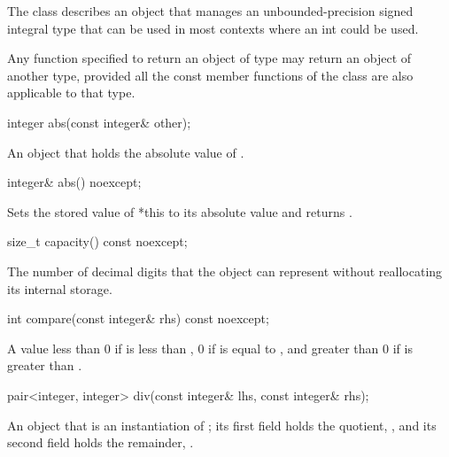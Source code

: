 The class describes an object that manages an unbounded-precision signed integral type that can be used in most contexts where an int could be used.

Any function specified to return an object of type  may return an object of another type, provided all the const member functions of the class  are also applicable to that type.

\begin{itemdecl}
integer abs(const integer& other);	
\end{itemdecl}

\begin{itemdescr}
\returns An object that holds the absolute value of .		
\end{itemdescr}

\begin{itemdecl}
integer& abs() noexcept;	
\end{itemdecl}

\begin{itemdescr}
\effects Sets the stored value of *this to its absolute value and returns .		
\end{itemdescr}

\begin{itemdecl}
size_t capacity() const noexcept;	
\end{itemdecl}

\begin{itemdescr}
\returns The number of decimal digits that the object can represent without reallocating its internal storage.		
\end{itemdescr}

\begin{itemdecl}
int compare(const integer& rhs) const noexcept;	
\end{itemdecl}

\begin{itemdescr}
\returns A value less than 0 if  is less than , 0 if  is equal to , and greater than 0 if  is greater than .	
\end{itemdescr}

\begin{itemdecl}
pair<integer, integer> div(const integer& lhs, const integer& rhs);	
\end{itemdecl}

\begin{itemdescr}
\returns An object that is an instantiation of ; its first field holds the quotient, , and its second field holds the remainder, .		
\end{itemdescr}

